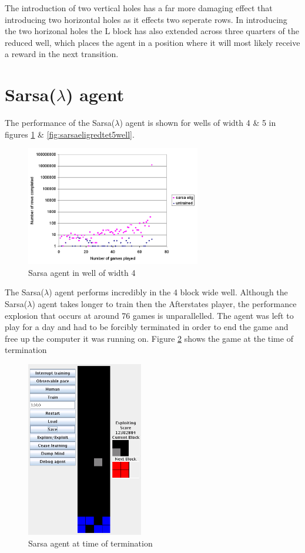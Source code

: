 \documentclass{rucsthesis}
\begin{document}
The introduction of two vertical holes has a far more damaging effect that introducing two horizontal holes as it effects two seperate rows. In introducing the two horizonal holes the L block has also extended across three quarters of the reduced well, which places the agent in a position where it will most likely receive a reward in the next transition.

\section{Sarsa($\lambda$) agent}

The performance of the Sarsa($\lambda$) agent is shown for wells of width 4 \& 5 in figures \ref{fig:sarsaeligredtet4well} \& \ref{fig:sarsaeligredtet5well}.

\begin{figure}[h]
\centering
\includegraphics[width=3in]{sarsaeligredtet4well.png}
\caption{Sarsa agent in well of width 4}
\label{fig:sarsaeligredtet4well}
\end{figure}

The Sarsa($\lambda$) agent performs incredibly in the 4 block wide well. Although the Sarsa($\lambda$) agent takes longer to train then the Afterstates player, the performance explosion that occurs at around 76 games is unparallelled. The agent was left to play for a day and had to be forcibly terminated in order to end the game and free up the computer it was running on. Figure \ref{fig:sarsaelig4term} shows the game at the time of termination 

\begin{figure}[h]
\centering
\includegraphics[width=2in]{sarsaelig4term.png}
\caption{Sarsa agent at time of termination}
\label{fig:sarsaelig4term}
\end{figure}
\end{document}

